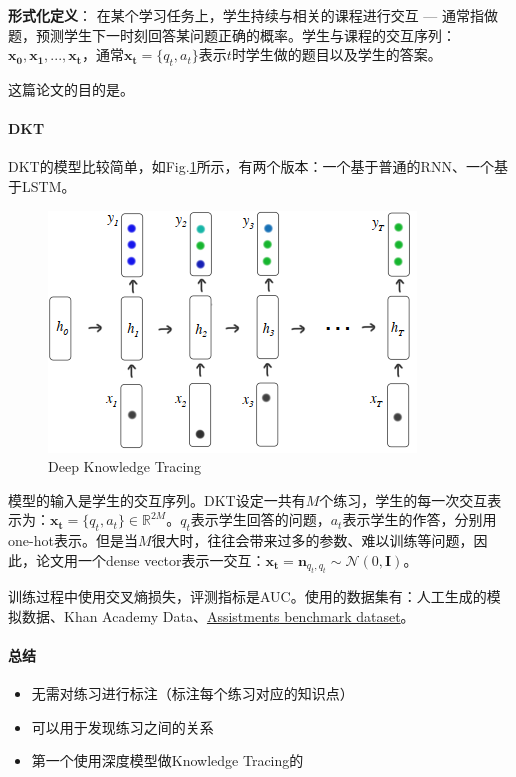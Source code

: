 \textbf{形式化定义}：
在某个学习任务上，学生持续与相关的课程进行交互 --- 通常指做题，预测学生下一时刻回答某问题正确的概率。学生与课程的交互序列：$\boldsymbol{x_0}, \boldsymbol{x_1}, ..., \boldsymbol{x_t}$，通常$\boldsymbol{x_t} = \{q_t, a_t\}$表示$t$时学生做的题目以及学生的答案。

这篇论文的目的是。

\paragraph{DKT}
DKT的模型比较简单，如Fig.\ref{fig:dkt}所示，有两个版本：一个基于普通的RNN、一个基于LSTM。

\begin{figure}[h]
	\centering
	\includegraphics[width=.35\textwidth]{pics/dkt.png}
	\caption{Deep Knowledge Tracing}
	\label{fig:dkt}
\end{figure}

模型的输入是学生的交互序列。DKT设定一共有$M$个练习，学生的每一次交互表示为：$\boldsymbol{x_t} = \{q_t, a_t\} \in \mathbb{R}^{2M}$。$q_t$表示学生回答的问题，$a_t$表示学生的作答，分别用one-hot表示。但是当$M$很大时，往往会带来过多的参数、难以训练等问题，因此，论文用一个dense vector表示一交互：$\boldsymbol{x_t} = \boldsymbol{n}_{q_t, q_t} \sim \mathcal{N}(0, \boldsymbol{I})$。

训练过程中使用交叉熵损失，评测指标是AUC。使用的数据集有：人工生成的模拟数据、Khan Academy Data、\href{https://sites.google.com/site/assistmentsdata/home/assistment-2009-2010-data}{Assistments benchmark dataset}。


\paragraph{总结}

\begin{itemize}
	\item 无需对练习进行标注（标注每个练习对应的知识点）
	\item 可以用于发现练习之间的关系 
	\item 第一个使用深度模型做Knowledge Tracing的
\end{itemize}

